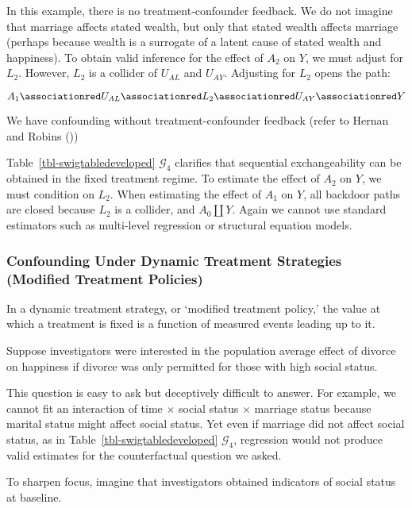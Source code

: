 \documentclass[
  single column]{article}
\begin{document}
In this example, there is no treatment-confounder feedback. We do not
imagine that marriage affects stated wealth, but only that stated wealth
affects marriage (perhaps because wealth is a surrogate of a latent
cause of stated wealth and happiness). To obtain valid inference for the
effect of \(A_2\) on \(Y\), we must adjust for \(L_2\). However, \(L_2\)
is a collider of \(U_{AL}\) and \(U_{AY}\). Adjusting for \(L_2\) opens
the path:

\[
A_1 \associationred U_{AL} \associationred L_2 \associationred U_{AY} \associationred Y
\]

We have confounding without treatment-confounder feedback (refer to
Hernan and Robins ())

Table~\ref{tbl-swigtabledeveloped} \(\mathcal{G}_4\) clarifies that
sequential exchangeability can be obtained in the fixed treatment
regime. To estimate the effect of \(A_2\) on \(Y\), we must condition on
\(L_2\). When estimating the effect of \(A_1\) on \(Y\), all backdoor
paths are closed because \(L_2\) is a collider, and \(A_0 \coprod Y\).
Again we cannot use standard estimators such as multi-level regression
or structural equation models.

\subsubsection{Confounding Under Dynamic Treatment Strategies (Modified
Treatment
Policies)}\label{confounding-under-dynamic-treatment-strategies-modified-treatment-policies}

In a dynamic treatment strategy, or `modified treatment policy,' the
value at which a treatment is fixed is a function of measured events
leading up to it.

Suppose investigators were interested in the population average effect
of divorce on happiness if divorce was only permitted for those with
high social status.

This question is easy to ask but deceptively difficult to answer. For
example, we cannot fit an interaction of time \(\times\) social status
\(\times\) marriage status because marital status might affect social
status. Yet even if marriage did not affect social status, as in
Table~\ref{tbl-swigtabledeveloped} \(\mathcal{G}_4\), regression would
not produce valid estimates for the counterfactual question we asked.

To sharpen focus, imagine that investigators obtained indicators of
social status at baseline.
\end{document}
